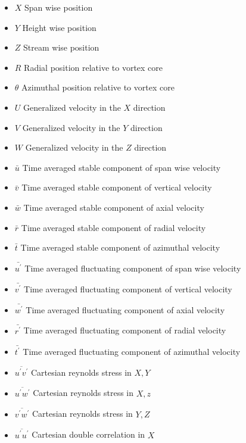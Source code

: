 \begin{itemize}[label={}]
\item	$X$	\tabto{1in}	Span wise position
\item	$Y$	\tabto{1in}	Height wise position
\item	$Z$	\tabto{1in}	Stream wise position
\item	$R$	\tabto{1in}	Radial position relative to vortex core
\item	$\theta$	\tabto{1in}	Azimuthal position relative to vortex core
\item	$U$	\tabto{1in}	Generalized velocity in the $X$ direction
\item	$V$	\tabto{1in}	Generalized velocity in the $Y$ direction
\item	$W$	\tabto{1in}	Generalized velocity in the $Z$ direction
\item	$\bar{u}$	\tabto{1in}	Time averaged stable component of span wise 
velocity
\item	$\bar{v}$	\tabto{1in}	Time averaged stable component of vertical 
velocity
\item	$\bar{w}$	\tabto{1in}	Time averaged stable component of axial velocity
\item	$\bar{r}$	\tabto{1in}	Time averaged stable component of radial 
velocity
\item	$\bar{t}$	\tabto{1in}	Time averaged stable component of azimuthal 
velocity
\item	$\bar{u^\prime}$	\tabto{1in}	Time averaged fluctuating component of 
span wise velocity
\item	$\bar{v^\prime}$	\tabto{1in}	Time averaged fluctuating component of 
vertical velocity
\item	$\bar{w^\prime}$	\tabto{1in}	Time averaged fluctuating component of 
axial velocity
\item	$\bar{r^\prime}$	\tabto{1in}	Time averaged fluctuating component of 
radial velocity
\item	$\bar{t^\prime}$	\tabto{1in}	Time averaged fluctuating component of 
azimuthal velocity
\item	$\overline{u^\prime v^\prime}$	\tabto{1in}	Cartesian reynolds stress 
in $X, Y$
\item	$\overline{u^\prime w^\prime}$	\tabto{1in}	Cartesian reynolds stress 
in $X, z$
\item	$\overline{v^\prime w^\prime}$	\tabto{1in}	Cartesian reynolds stress 
in $Y, Z$
\item	$\overline{u^\prime u^\prime}$	\tabto{1in}	Cartesian double 
correlation in $X$

\end{itemize}
